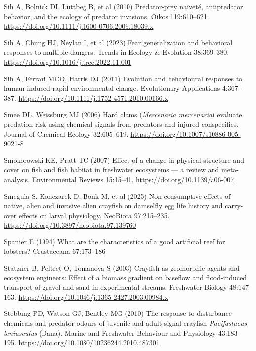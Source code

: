 \documentclass[
  12pt,
  a4paper,
]{scrbook}
\newlength{\cslhangindent}
\newenvironment{CSLReferences}[2] %
 {\begin{list}{}{%
  \setlength{\itemindent}{0pt}
  \setlength{\leftmargin}{0pt}
  \setlength{\parsep}{0pt}
  \ifodd #1
   \setlength{\leftmargin}{\cslhangindent}
   \setlength{\itemindent}{-1\cslhangindent}
  \fi
  \setlength{\itemsep}{#2\baselineskip}}}
 {\end{list}}
\begin{document}
\begin{CSLReferences}{1}{1}
Sih A, Bolnick DI, Luttbeg B, et al (2010) Predator-prey naïveté,
antipredator behavior, and the ecology of predator invasions. Oikos
119:610--621. \url{https://doi.org/10.1111/j.1600-0706.2009.18039.x}

Sih A, Chung HJ, Neylan I, et al (2023) Fear generalization and
behavioral responses to multiple dangers. Trends in Ecology \& Evolution
38:369--380. \url{https://doi.org/10.1016/j.tree.2022.11.001}

Sih A, Ferrari MCO, Harris DJ (2011) Evolution and behavioural responses
to human‐induced rapid environmental change. Evolutionary Applications
4:367--387. \url{https://doi.org/10.1111/j.1752-4571.2010.00166.x}

Smee DL, Weissburg MJ (2006) Hard clams ({\emph{Mercenaria mercenaria}})
evaluate predation risk using chemical signals from predators and
injured conspecifics. Journal of Chemical Ecology 32:605--619.
\url{https://doi.org/10.1007/s10886-005-9021-8}

Smokorowski KE, Pratt TC (2007) Effect of a change in physical structure
and cover on fish and fish habitat in freshwater ecosystems --- a review
and meta-analysis. Environmental Reviews 15:15--41.
\url{https://doi.org/10.1139/a06-007}

Sniegula S, Konczarek D, Bonk M, et al (2025) Non-consumptive effects of
native, alien and invasive alien crayfish on damselfly egg life history
and carry-over effects on larval physiology. NeoBiota 97:215--235.
\url{https://doi.org/10.3897/neobiota.97.139760}

Spanier E (1994) What are the characteristics of a good artificial reef
for lobsters? Crustaceana 67:173--186

Statzner B, Peltret O, Tomanova S (2003) Crayfish as geomorphic agents
and ecosystem engineers: Effect of a biomass gradient on baseflow and
flood-induced transport of gravel and sand in experimental streams.
Freshwater Biology 48:147--163.
\url{https://doi.org/10.1046/j.1365-2427.2003.00984.x}

Stebbing PD, Watson GJ, Bentley MG (2010) The response to disturbance
chemicals and predator odours of juvenile and adult signal crayfish
{\emph{Pacifastacus leniusculus}} ({Dana}). Marine and Freshwater
Behaviour and Physiology 43:183--195.
\url{https://doi.org/10.1080/10236244.2010.487301}


\end{CSLReferences}
\end{document}
